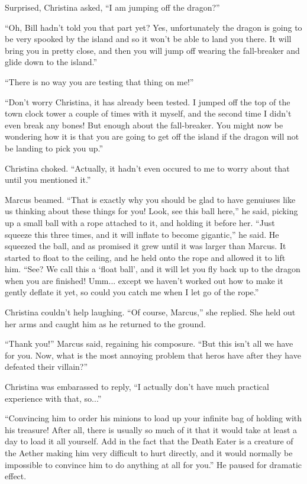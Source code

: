 \documentclass[showtrims,b6paper,draft,10pt]{memoir}
\begin{document}
Surprised, Christina asked,  ``I am jumping off the dragon?''

``Oh, Bill hadn't told you that part yet?  Yes, unfortunately the dragon is going to be very spooked by the island and so it won't be able to land you there.  It will bring you in pretty close, and then you will jump off wearing the fall-breaker and glide down to the island.''

``There is no way you are testing that thing on me!''

``Don't worry Christina, it has already been tested.  I jumped off the top of the town clock tower a couple of times with it myself, and the second time I didn't even break any bones!  But enough about the fall-breaker.  You might now be wondering how it is that you are going to get off the island if the dragon will not be landing to pick you up.''

Christina choked.  ``Actually, it hadn't even occured to me to worry about that until you mentioned it.''

Marcus beamed.  ``That is exactly why you should be glad to have genuiuses like us thinking about these things for you!  Look, see this ball here,'' he said, picking up a small ball with a rope attached to it, and holding it before her.  ``Just squeeze this three times, and it will inflate to become gigantic,'' he said.  He squeezed the ball, and as promised it grew until it was larger than Marcus.  It started to float to the ceiling, and he held onto the rope and allowed it to lift him.  ``See?  We call this a `float ball', and it will let you fly back up to the dragon when you are finished!  Umm... except we haven't worked out how to make it gently deflate it yet, so could you catch me when I let go of the rope.''

Christina couldn't help laughing.  ``Of course, Marcus,'' she replied.  She held out her arms and caught him as he returned to the ground.

``Thank you!'' Marcus said, regaining his composure.  ``But this isn't all we have for you.  Now, what is the most annoying problem that heros have after they have defeated their villain?''

Christina was embarassed to reply, ``I actually don't have much practical experience with that, so...''

``Convincing him to order his minions to load up your infinite bag of holding with his treasure!  After all, there is usually so much of it that it would take at least a day to load it all yourself.  Add in the fact that the Death Eater is a creature of the Aether making him very difficult to hurt directly, and it would normally be impossible to convince him to do anything at all for you.''  He paused for dramatic effect.
\end{document}
